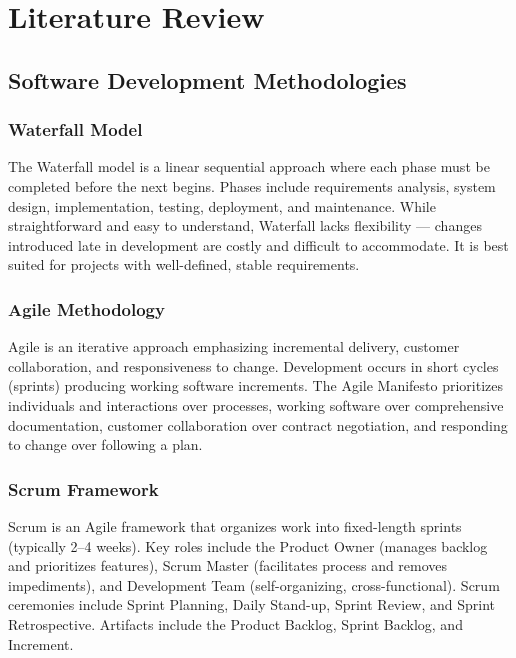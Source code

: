 \documentclass[12pt,a4paper]{report}
\begin{document}
\chapter{Literature Review}

\section{Software Development Methodologies}

\subsection{Waterfall Model}
The Waterfall model is a linear sequential approach where each phase must be completed before the next begins. Phases include requirements analysis, system design, implementation, testing, deployment, and maintenance. While straightforward and easy to understand, Waterfall lacks flexibility — changes introduced late in development are costly and difficult to accommodate. It is best suited for projects with well-defined, stable requirements.

\subsection{Agile Methodology}
Agile is an iterative approach emphasizing incremental delivery, customer collaboration, and responsiveness to change. Development occurs in short cycles (sprints) producing working software increments. The Agile Manifesto prioritizes individuals and interactions over processes, working software over comprehensive documentation, customer collaboration over contract negotiation, and responding to change over following a plan.

\subsection{Scrum Framework}
Scrum is an Agile framework that organizes work into fixed-length sprints (typically 2–4 weeks). Key roles include the Product Owner (manages backlog and prioritizes features), Scrum Master (facilitates process and removes impediments), and Development Team (self-organizing, cross-functional). Scrum ceremonies include Sprint Planning, Daily Stand-up, Sprint Review, and Sprint Retrospective. Artifacts include the Product Backlog, Sprint Backlog, and Increment.
\end{document}
